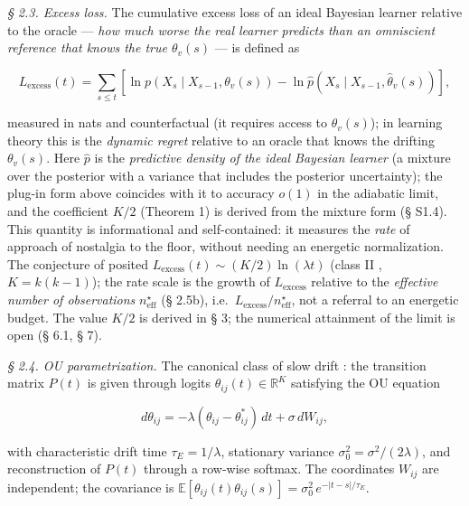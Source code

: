 \documentclass[12pt]{iopart}
\begin{document}
\emph{§ 2.3. Excess loss.} The cumulative excess loss of an ideal Bayesian learner relative to the oracle --- \emph{how much worse the real learner predicts than an omniscient reference that knows the true \(\theta_v(s)\)} --- is defined \cite{Andriishin2026b} as



\[L_{\text{excess}}(t) = \sum_{s\le t}\left[\ln p(X_s\mid X_{s-1},\theta_v(s)) - \ln\hat p(X_s\mid X_{s-1}, \hat\theta_v(s))\right],\]



measured in nats and counterfactual (it requires access to \(\theta_v(s)\)); in learning theory this is the \emph{dynamic regret} relative to an oracle that knows the drifting \(\theta_v(s)\). Here \(\hat p\) is the \emph{predictive density of the ideal Bayesian learner} (a mixture over the posterior with a variance that includes the posterior uncertainty); the plug-in form above coincides with it to accuracy \(o(1)\) in the adiabatic limit, and the coefficient \(K/2\) (Theorem 1) is derived from the mixture form (§ S1.4). This quantity is informational and self-contained: it measures the \emph{rate} of approach of nostalgia to the floor, without needing an energetic normalization. The conjecture of \cite{Andriishin2026b} posited \(L_{\text{excess}}(t) \sim (K/2)\ln(\lambda t)\) (class II \cite{BialekNemenmanTishby2001}, \(K = k(k-1)\)); the rate scale is the growth of \(L_{\text{excess}}\) relative to the \emph{effective number of observations} \(n_{\text{eff}}^\star\) (§ 2.5b), i.e.~\(L_{\text{excess}}/n_{\text{eff}}^\star\), not a referral to an energetic budget. The value \(K/2\) is derived in § 3; the numerical attainment of the limit is open (§ 6.1, § 7).



\emph{§ 2.4. OU parametrization.} The canonical class of slow drift \cite{Andriishin2026b}: the transition matrix \(P(t)\) is given through logits \(\theta_{ij}(t) \in \mathbb{R}^K\) satisfying the OU equation



\begin{equation}d\theta_{ij} = -\lambda(\theta_{ij} - \theta_{ij}^*)\,dt + \sigma\,dW_{ij}, \tag{2.1}\end{equation}



with characteristic drift time \(\tau_E = 1/\lambda\), stationary variance \(\sigma_0^2 = \sigma^2/(2\lambda)\), and reconstruction of \(P(t)\) through a row-wise softmax. The coordinates \(W_{ij}\) are independent; the covariance is \(\mathbb{E}[\theta_{ij}(t)\theta_{ij}(s)] = \sigma_0^2\,e^{-|t-s|/\tau_E}\).
\end{document}
